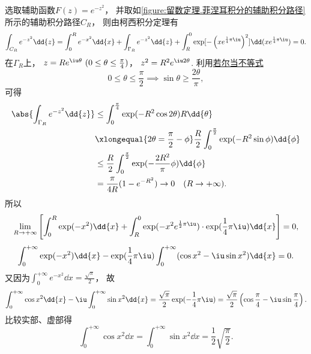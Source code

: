 \begin{example}
\begin{solution}
选取辅助函数\(F(z) = e^{-z^2}\)，
并取如\cref{figure:留数定理.菲涅耳积分的辅助积分路径} 所示的辅助积分路径\(C_R\)，
则由柯西积分定理有\begin{equation*}
	\int_{C_R} e^{-z^2} \dd{z}
	= \int_0^R e^{-x^2} \dd{x}
	+ \int_{\Gamma_R} e^{-z^2} \dd{z}
	+ \int_R^0 \exp[-\left(x e^{\frac{1}{4}\pi\iu}\right)^2] \dd(x e^{\frac{1}{4}\pi\iu})
	= 0.
\end{equation*}
在\(\Gamma_R\)上，
\(z = R e^{\iu\theta}\ (0\leq\theta\leq\frac{\pi}{4})\)，
\(z^2 = R^2 e^{\iu2\theta}\).
利用\hyperref[equation:微分中值定理.若尔当不等式]{若尔当不等式}\begin{equation*}
	0\leq\theta\leq\frac{\pi}{2}
	\implies
	\sin\theta\geq\frac{2\theta}{\pi},
\end{equation*}
可得\begin{align*}
	\abs{\int_{\Gamma_R} e^{-z^2} \dd{z}}
	&\leq
	\int_0^{\frac{\pi}{4}} \exp(-R^2 \cos2\theta) R\dd{\theta} \\
	&\xlongequal{2\theta=\frac{\pi}{2}-\phi}
	\frac{R}{2} \int_0^{\frac{\pi}{2}} \exp(-R^2 \sin\phi) \dd{\phi} \\
	&\leq
	\frac{R}{2} \int_0^{\frac{\pi}{2}} \exp(-\frac{2R^2}{\pi}\phi) \dd{\phi} \\
	&= \frac{\pi}{4R} (1-e^{-R^2})
	\to0\quad(R\to+\infty).
\end{align*}
所以\begin{equation*}
	\lim_{R\to+\infty} \left[
		\int_0^R \exp(-x^2) \dd{x}
		+ \int_R^0 \exp(-x^2 e^{\frac{1}{2}\pi\iu})
		\cdot \exp(\frac{1}{4}\pi\iu) \dd{x}
	\right] = 0,
\end{equation*}\begin{equation*}
	\int_0^{+\infty} \exp(-x^2) \dd{x}
	- \exp(\frac{1}{4}\pi\iu)
	\int_0^{+\infty} (\cos x^2 - \iu \sin x^2) \dd{x} = 0.
\end{equation*}
又因为\(\int_0^{+\infty} e^{-x^2} \dd{x} = \frac{\sqrt{\pi}}{2}\)，
故\begin{equation*}
	\int_0^{+\infty} \cos x^2 \dd{x}
	- \iu \int_0^{+\infty} \sin x^2 \dd{x}
	= \frac{\sqrt{\pi}}{2} \exp(-\frac{1}{4}\pi\iu)
	= \frac{\sqrt{\pi}}{2} \left(\cos\frac{\pi}{4} - \iu \sin\frac{\pi}{4}\right).
\end{equation*}
比较实部、虚部得\begin{equation}\label{equation:留数定理.菲涅耳积分}
	\int_0^{+\infty} \cos x^2 \dd{x}
	= \int_0^{+\infty} \sin x^2 \dd{x}
	= \frac{1}{2} \sqrt{\frac{\pi}{2}}.
\end{equation}
\end{solution}
\end{example}

